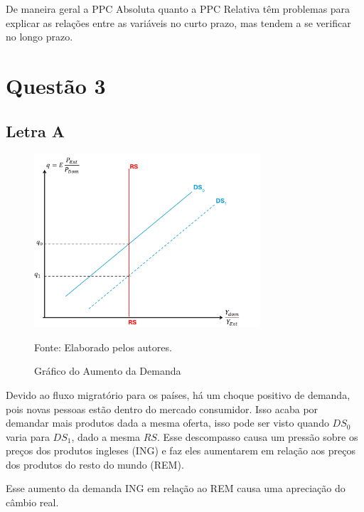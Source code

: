 \documentclass[a4paper,12pt]{article}[abntex2]
\begin{document}
De maneira geral a PPC Absoluta quanto a PPC Relativa têm problemas para explicar as relações entre as variáveis no curto prazo, mas tendem a se verificar no longo prazo. 

\section{\textbf{Questão 3}}

\subsection{\textbf{Letra A}}
\begin{figure}[H]
    \centering
    \caption{Gráfico do Aumento da Demanda} 
    \includegraphics[width=0.75\textwidth]{Macroeconomia Internacional/APS 3 Macro Int/Gráfico do Aumento da Demanda.png}
    \label{fig:aumentodemanda}
    
    \footnotesize{Fonte: Elaborado pelos autores.}
    \end{figure}

Devido ao fluxo migratório para os países, há um choque positivo de demanda, pois novas pessoas estão dentro do mercado consumidor. Isso acaba por demandar mais produtos dada a mesma oferta, isso pode ser visto quando $DS_0$ varia para $DS_1$, dado a mesma $RS$. Esse descompasso causa um pressão sobre os preços dos produtos ingleses (ING) e faz eles aumentarem em relação aos preços dos produtos do resto do mundo (REM).

Esse aumento da demanda ING em relação ao REM causa uma apreciação do câmbio real.
\end{document}
